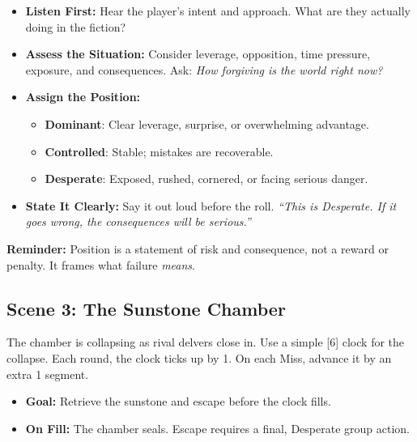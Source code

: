 \begin{tcolorbox}[title=How to Set Position in Play, colback=white!97!gray, colframe=black!80!gray]

\begin{itemize}
\item \textbf{Listen First:} Hear the player’s intent and approach. What are they actually doing in the fiction?

\item \textbf{Assess the Situation:} Consider leverage, opposition, time pressure, exposure, and consequences. Ask: \emph{How forgiving is the world right now?}

\item \textbf{Assign the Position:}
\begin{itemize}
  \item \textbf{Dominant}: Clear leverage, surprise, or overwhelming advantage.
  \item \textbf{Controlled}: Stable; mistakes are recoverable.
  \item \textbf{Desperate}: Exposed, rushed, cornered, or facing serious danger.
\end{itemize}

\item \textbf{State It Clearly:} Say it out loud before the roll.  
\emph{“This is Desperate. If it goes wrong, the consequences will be serious.”}
\end{itemize}

\textbf{Reminder:} Position is a statement of risk and consequence, not a reward or penalty. It frames what failure \emph{means}.
\end{tcolorbox}

\subsection*{Scene 3: The Sunstone Chamber}
\label{subsec:sunstone-chamber}
The chamber is collapsing as rival delvers close in. Use a simple [6] clock for the collapse. Each round, the clock ticks up by 1. On each Miss, advance it by an extra 1 segment.

\begin{itemize}
\item \textbf{Goal:} Retrieve the sunstone and escape before the clock fills.
\item \textbf{On Fill:} The chamber seals. Escape requires a final, Desperate group action.
\end{itemize}

